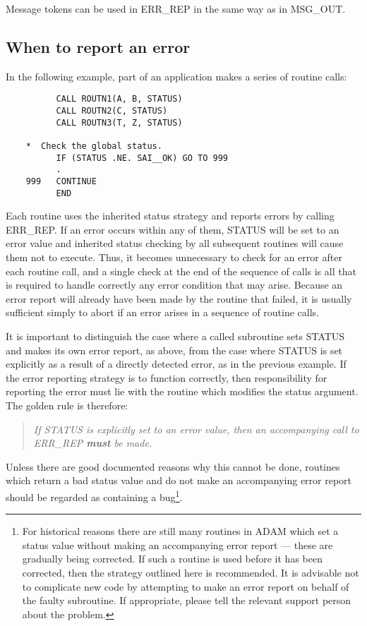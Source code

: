 Message tokens can be used in ERR\_REP in the same way as in MSG\_OUT.

\subsection{When to report an error}

In the following example, part of an application makes a series of routine
calls:

\begin{small}
\begin{verbatim}
          CALL ROUTN1(A, B, STATUS)
          CALL ROUTN2(C, STATUS)
          CALL ROUTN3(T, Z, STATUS)

    *  Check the global status.
          IF (STATUS .NE. SAI__OK) GO TO 999
          .
    999   CONTINUE
          END
\end{verbatim}
\end{small}

Each routine uses the inherited status strategy and reports errors by calling
ERR\_REP.
If an error occurs within any of them, STATUS will be set to an error value
and inherited status checking by all subsequent routines will cause them not
to execute.
Thus, it becomes unnecessary to check for an error after each routine call,
and a single check at the end of the sequence of calls is all that is required
to handle correctly any error condition that may arise.
Because an error report will already have been made by the routine that failed,
it is usually sufficient simply to abort if an error arises in a sequence of
routine calls.

It is important to distinguish the case where a called subroutine sets STATUS
and makes its own error report, as above, from the case where STATUS is set
explicitly as a result of a directly detected error, as in the previous example.
If the error reporting strategy is to function correctly, then responsibility
for reporting the error must lie with the routine which modifies the status
argument.
The golden rule is therefore:

\begin {quote}
{\em If STATUS is explicitly set to an error value, then an accompanying
call to ERR\_REP {\bf must} be made.}
\end {quote}

Unless there are good documented reasons why this cannot be done,
routines which return a bad status value and do not make an accompanying
error report should be regarded as containing a bug\footnote{For historical
reasons there are still many routines in ADAM which set a status value without
making an accompanying error report --- these are gradually being corrected.
If such a routine is used before it has been corrected, then the strategy
outlined here is recommended.
It is advisable not to complicate new code by attempting to make an error
report on behalf of the faulty subroutine.
If appropriate, please tell the relevant support person about the problem.}.

